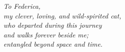 \vspace*{5cm}
\begin{flushright}
    \itshape
    To Federica, \\
    my clever, loving, and wild-spirited cat, \\
    who departed during this journey \\
    and walks forever beside me; \\
    entangled beyond space and time.
\end{flushright}
